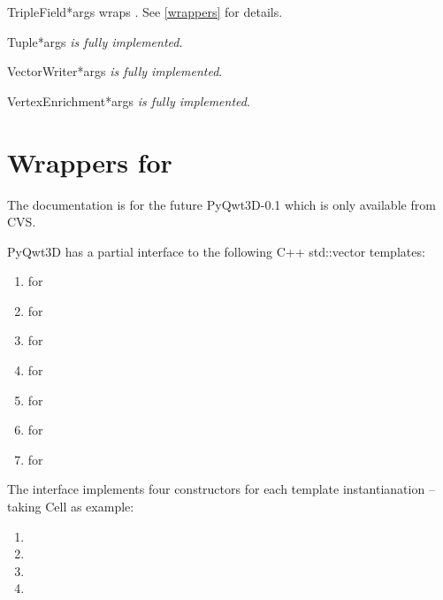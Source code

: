 \documentclass{manual}
\newcommand{\Future}{
  \begin{notice}[warning]
    The documentation is for the future PyQwt3D-0.1 which is only available
    from CVS.
  \end{notice}
}
\begin{document}
\begin{classdesc}{TripleField}{*args}
wraps . See \ref{wrappers} for details.
\end{classdesc}

\begin{classdesc}{Tuple}{*args}
\emph{is fully implemented}.
\end{classdesc}

\begin{classdesc}{VectorWriter}{*args}
\emph{is fully implemented}.
\end{classdesc}

\begin{classdesc}{VertexEnrichment}{*args}
\emph{is fully implemented}.
\end{classdesc}

\section{Wrappers for  \label{wrappers}}

\Future{}

PyQwt3D has a partial interface to the following C++ std::vector templates:
\begin{enumerate}
\item
   for 
\item
   for 
\item
   for 
\item
   for 
\item
   for 
\item
   for 
\item
   for 
\end{enumerate}

The interface implements four constructors for each template instantianation --
taking Cell as example:
\begin{enumerate}
\item
\item
\item
\item
\end{enumerate}
\end{document}
